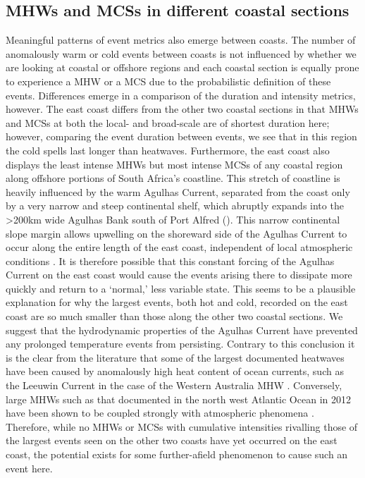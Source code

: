 \documentclass[a4paper,10pt,review]{elsarticle}
\begin{document}
\subsection{MHWs and MCSs in different coastal sections}
Meaningful patterns of event metrics also emerge between coasts. The number of anomalously warm or cold events between coasts is not influenced by whether we are looking at coastal or offshore regions and each coastal section is equally prone to experience a MHW or a MCS due to the probabilistic definition of these events. Differences emerge in a comparison of the duration and intensity metrics, however. The east coast differs from the other two coastal sections in that MHWs and MCSs at both the local- and broad-scale are of shortest duration here; however, comparing the event duration between events, we see that in this region the cold spells last longer than heatwaves. Furthermore, the east coast also displays the least intense MHWs but most intense MCSs of any coastal region along offshore portions of South Africa's coastline. This stretch of coastline is heavily influenced by the warm Agulhas Current, separated from the coast only by a very narrow and steep continental shelf, which abruptly expands into the >200km wide Agulhas Bank south of Port Alfred (). This narrow continental slope margin allows upwelling on the shoreward side of the Agulhas Current to occur along the entire length of the east coast, independent of local atmospheric conditions \citep{Lutjeharms2000}. It is therefore possible that this constant forcing of the Agulhas Current on the east coast would cause the events arising there to dissipate more quickly and return to a `normal,' less variable state. This seems to be a plausible explanation for why the largest events, both hot and cold, recorded on the east coast are so much smaller than those along the other two coastal sections. We suggest that the hydrodynamic properties of the Agulhas Current have prevented any prolonged temperature events from persisting. Contrary to this conclusion it is the clear from the literature that some of the largest documented heatwaves have been caused by anomalously high heat content of ocean currents, such as the Leeuwin Current in the case of the Western Australia MHW \citep{Feng2013, Pearce2013, Wernberg2013}. Conversely, large MHWs such as that documented in the north west Atlantic Ocean in 2012 have been shown to be coupled strongly with atmospheric phenomena \citep{Mills2012, Chen2014, Chen2015}. Therefore, while no MHWs or MCSs with cumulative intensities rivalling those of the largest events seen on the other two coasts have yet occurred on the east coast, the potential exists for some further-afield phenomenon to cause such an event here.
\end{document}
